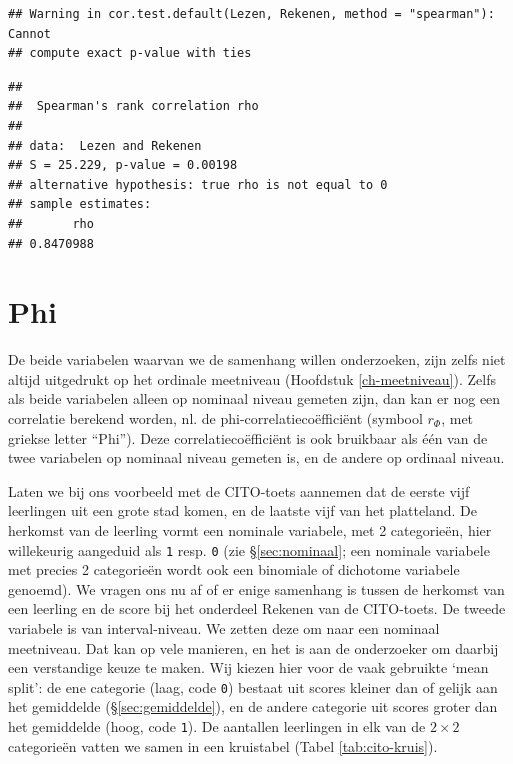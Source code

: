 \documentclass[
]{book}
\begin{document}
\begin{verbatim}
## Warning in cor.test.default(Lezen, Rekenen, method = "spearman"): Cannot
## compute exact p-value with ties
\end{verbatim}

\begin{verbatim}
## 
##  Spearman's rank correlation rho
## 
## data:  Lezen and Rekenen
## S = 25.229, p-value = 0.00198
## alternative hypothesis: true rho is not equal to 0
## sample estimates:
##       rho 
## 0.8470988
\end{verbatim}

\section{Phi}\label{sec:Phi}

De beide variabelen waarvan we de samenhang willen onderzoeken, zijn
zelfs niet altijd uitgedrukt op het ordinale meetniveau
(Hoofdstuk \ref{ch-meetniveau}). Zelfs als beide variabelen alleen op
nominaal niveau gemeten zijn, dan kan er nog een correlatie berekend
worden, nl. de phi-correlatiecoëfficiënt (symbool \(r_\Phi\), met griekse
letter ``Phi''). Deze correlatiecoëfficiënt is ook bruikbaar als één van
de twee variabelen op nominaal niveau gemeten is, en de andere op
ordinaal niveau.

Laten we bij ons voorbeeld met de CITO-toets aannemen dat de eerste vijf
leerlingen uit een grote stad komen, en de laatste vijf van het
platteland. De herkomst van de leerling vormt een nominale variabele,
met 2 categorieën, hier willekeurig aangeduid als \texttt{1} resp. \texttt{0} (zie
§\ref{sec:nominaal}; een nominale variabele met precies 2
categorieën wordt ook een binomiale of dichotome variabele genoemd). We
vragen ons nu af of er enige samenhang is tussen de herkomst van een
leerling en de score bij het onderdeel Rekenen van de CITO-toets. De
tweede variabele is van interval-niveau. We zetten deze om naar een
nominaal meetniveau. Dat kan op vele manieren, en het is aan de
onderzoeker om daarbij een verstandige keuze te maken. Wij kiezen hier
voor de vaak gebruikte `mean split': de ene categorie (laag, code \texttt{0})
bestaat uit scores kleiner dan of gelijk aan het gemiddelde
(§\ref{sec:gemiddelde}), en de andere categorie uit scores groter
dan het gemiddelde (hoog, code \texttt{1}). De aantallen leerlingen in elk van
de \(2\times 2\) categorieën vatten we samen in een kruistabel
(Tabel \ref{tab:cito-kruis}).
\end{document}
